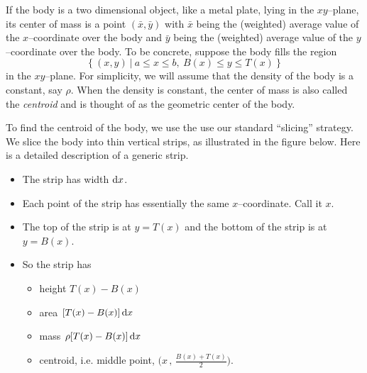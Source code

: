 If the body is a two dimensional object, like a metal plate, lying in
the $xy$--plane, its center of mass is a point $(\bar x,\bar y)$
with $\bar x$ being the (weighted) average value of the $x$--coordinate
over the body and $\bar y$ being the (weighted) average value of the
$y$--coordinate over the body. To be concrete, suppose the body fills the
region
\begin{equation*}
\big\{\ (x,y)\ \big|\ a\le x\le b,\ B(x)\le y\le T(x)\ \big\}
\end{equation*}
in the $xy$--plane. For simplicity, we will assume that the density
of the body is a constant, say $\rho$. When the density is constant,
the center of mass is also called the \emph{centroid} and is thought of
as the geometric center of the body.

To find the centroid of the body, we use the use our standard ``slicing''
strategy. We slice the body into thin vertical strips, as illustrated in
the figure below.%
Here is a detailed description of a generic strip.
\begin{itemize}\itemsep1pt \parskip0pt  %
\item The strip has width $\mathrm{d}x$.
\item Each point of the strip has essentially the same $x$--coordinate.
Call it $x$.
\item The top of the strip is at $y=T(x)$ and the bottom of the strip is
at $y=B(x)$.
\item So the strip has
\begin{itemize}\itemsep1pt \parskip0pt  %
\item height $T(x)-B(x)$
\item area $[T(x)-B(x)]\,\mathrm{d}x$
\item mass $\rho[T(x)-B(x)]\,\mathrm{d}x$
\item centroid, i.e. middle point, $\big(x\,,\,\frac{B(x)+T(x)}{2}\big)$.
\end{itemize}
\end{itemize}
